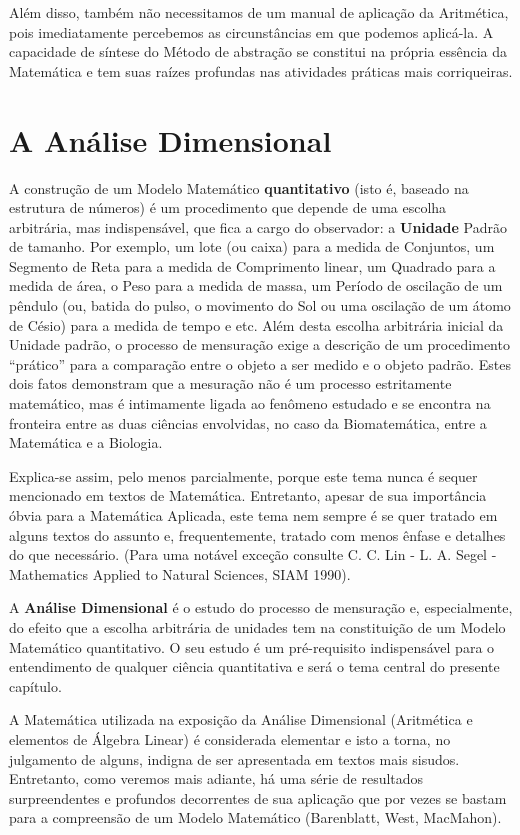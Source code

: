     Além disso, também não necessitamos de um manual de aplicação da Aritmética, pois imediatamente percebemos as circunstâncias em que podemos aplicá-la. A capacidade de síntese do Método de abstração se constitui na própria essência da Matemática e tem suas raízes profundas nas atividades práticas mais corriqueiras.

\section{A Análise Dimensional}

    A construção de um Modelo Matemático \textbf{quantitativo} (isto é, baseado na estrutura de números) é um procedimento que depende de uma escolha arbitrária, mas indispensável, que fica a cargo do observador: a \textbf{Unidade} Padrão de tamanho. Por exemplo, um lote (ou caixa) para a medida de Conjuntos, um Segmento de Reta para a medida de Comprimento linear, um Quadrado para a medida de área, o Peso para a medida de massa, um Período de oscilação de um pêndulo (ou, batida do pulso, o movimento do Sol ou uma oscilação de um átomo de Césio) para a medida de tempo e etc. Além desta escolha arbitrária inicial da Unidade padrão, o processo de mensuração exige a descrição de um procedimento ``prático'' para a comparação entre o objeto a ser medido e o objeto padrão. Estes dois fatos demonstram que a mesuração não é um processo estritamente matemático, mas é intimamente ligada ao fenômeno estudado e se encontra na fronteira entre as duas ciências envolvidas, no caso da Biomatemática, entre a Matemática e a Biologia.

    Explica-se assim, pelo menos parcialmente, porque este tema nunca é sequer mencionado em textos de Matemática. Entretanto, apesar de sua importância óbvia para a Matemática Aplicada, este tema nem sempre é se quer tratado em alguns textos do assunto e, frequentemente, tratado com menos ênfase e detalhes do que necessário. (Para uma notável exceção consulte C. C. Lin - L. A. Segel - Mathematics Applied to Natural Sciences, SIAM 1990).
    
    A \textbf{Análise Dimensional} é o estudo do processo de mensuração e, especialmente, do efeito que a escolha arbitrária de unidades tem na constituição de um Modelo Matemático quantitativo. O seu estudo é um pré-requisito indispensável para o entendimento de qualquer ciência quantitativa e será o tema central do presente capítulo.

    A Matemática utilizada na exposição da Análise Dimensional (Aritmética e elementos de Álgebra Linear) é considerada elementar e isto a torna, no julgamento de alguns, indigna de ser apresentada em textos mais sisudos. Entretanto, como veremos mais adiante, há uma série de resultados surpreendentes e profundos decorrentes de sua aplicação que por vezes se bastam para a compreensão de um Modelo Matemático (Barenblatt, West, MacMahon).

